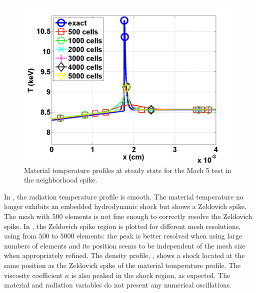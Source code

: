 \begin{figure}[H]
                \centering
                \includegraphics[width=\textwidth]{figures/Mach_5_comparison.png}
        \caption{Material temperature profiles at steady state for the Mach 5 test in the neighborhood spike.}\label{fig:Mach5_comparison}
\end{figure}
In , the radiation temperature profile is smooth. The material temperature no longer exhibits an embedded hydrodynamic shock but shows a Zeldovich spike. The mesh with $500$ elements is not fine enough to correctly resolve the Zeldovich spike. In , the Zeldovich spike region is plotted for different mesh resolutions, using from $500$ to $5000$ elements: the peak is better resolved when using large numbers of elements and its position seems to be independent of the mesh size when appropriately refined. The density profile, , shows a shock located at the same position as the Zeldovich spike of the material temperature profile. The viscosity coefficient $\kappa$ is also peaked in the shock region, as expected. The material and radiation variables do not present any numerical oscillations. 
